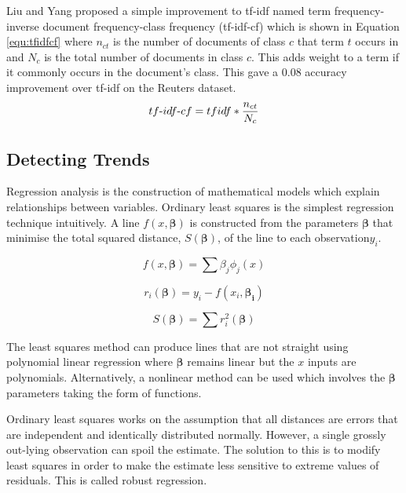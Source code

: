 			Liu and Yang proposed a simple improvement to tf-idf named term frequency-inverse document frequency-class frequency (tf-idf-cf) which is shown in Equation \ref{equ:tfidfcf} where $n_{ct}$ is the number of documents of class $c$ that term $t$ occurs in and $N_{c}$ is the total number of documents in class $c$\cite{tfidfcf_categorization_liu}. This adds weight to a term if it commonly occurs in the document's class. This gave a 0.08 accuracy improvement over tf-idf on the Reuters dataset.
			\begin{equation}\label{equ:tfidfcf}
				tf\textnormal{-}idf\textnormal{-}cf = tfidf * \frac{n_{ct}}{N_{c}}
			\end{equation}
		\subsection{Detecting Trends}
			Regression analysis is the construction of mathematical models which explain relationships between variables. Ordinary least squares is the simplest regression technique intuitively. A line $f(x,\mathbf{\beta})$ is constructed from the parameters $\mathbf{\beta}$ that minimise the total squared distance, $S(\mathbf{\beta})$, of the line to each observation$y_i$\cite{regression_analysis_seber}. 
			
			\begin{equation}\label{equ:param}
				f(x,\mathbf{\beta}) = \sum \beta_j \phi_j(x)
			\end{equation}
			
			\begin{equation}\label{equ:regdistance}
				r_i(\mathbf{\beta}) = y_i - f(x_i,\mathbf{\beta_i})
			\end{equation}
			
			\begin{equation}\label{equ:regsum}
				S(\mathbf{\beta}) = \sum r^2_i(\mathbf{\beta})
			\end{equation}

			The least squares method can produce lines that are not straight using polynomial linear regression where $\mathbf{\beta}$ remains linear but the $x$ inputs are polynomials. Alternatively, a nonlinear method can be used which involves the $\mathbf{\beta}$ parameters taking the form of functions\cite{nonlinear_regression_motulsky}.
			
			Ordinary least squares works on the assumption that all distances are errors that are independent and identically distributed normally. However, a single grossly out-lying observation can spoil the estimate\cite{robust_regression_huber}. The solution to this is to modify least squares in order to make the estimate less sensitive to extreme values of residuals. This is called robust regression.	
			
